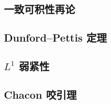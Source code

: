 

\subsection{一致可积性再论}
\label{b1:subsec:100501}

\subsection{Dunford–Pettis 定理}
\label{b1:subsec:100502}

\subsection{\texorpdfstring{\(L^1\)}{L1} 弱紧性}
\label{b1:subsec:100503}

\subsection{Chacon 咬引理}
\label{b1:subsec:100504}


